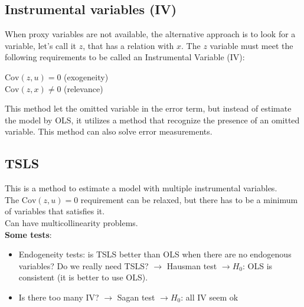 \documentclass[10pt, a4paper, landscape]{extarticle}
\newcommand{\Cov}{\mathrm{Cov}}
\begin{document}
\begin{multicols}{3}
	\subsection*{Instrumental variables (IV)}
		When proxy variables are not available, the alternative approach is to look for a variable, let's call it $z$, that has a relation with $x$. The $z$ variable must meet the following requirements to be called an Instrumental Variable (IV):
		\begin{center}
			$\Cov(z,u) = 0$ (exogeneity) \\
			$\Cov(z,x) \neq 0$ (relevance)
		\end{center}
		This method let the omitted variable in the error term, but instead of estimate the model by OLS, it utilizes a method that recognize the presence of an omitted variable. This method can also solve error measurements.
	\subsection*{TSLS}
		This is a method to estimate a model with multiple instrumental variables. \\
		The $\Cov(z,u) = 0$ requirement can be relaxed, but there has to be a minimum of variables that satisfies it. \\
		Can have multicollinearity problems. \\
		\textbf{Some tests}:
		\begin{itemize}[leftmargin=*]
			\item Endogeneity tests:  is TSLS better than OLS when there are no endogenous variables? Do we really need TSLS? $\rightarrow$ Hausman test $\rightarrow H_0$: OLS is consistent (it is better to use OLS).
			\item Is there too many IV? $\rightarrow$ Sagan test $\rightarrow H_0$: all IV seem ok
		\end{itemize}
	

\end{multicols}
\end{document}
